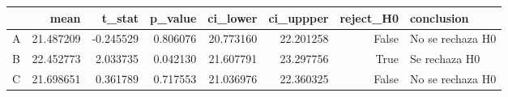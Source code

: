 \begin{tabular}{lrrrrrrl}
\toprule
 & mean & t_stat & p_value & ci_lower & ci_uppper & reject_H0 & conclusion \\
\midrule
A & 21.487209 & -0.245529 & 0.806076 & 20.773160 & 22.201258 & False & No se rechaza H0 \\
B & 22.452773 & 2.033735 & 0.042130 & 21.607791 & 23.297756 & True & Se rechaza H0 \\
C & 21.698651 & 0.361789 & 0.717553 & 21.036976 & 22.360325 & False & No se rechaza H0 \\
\bottomrule
\end{tabular}
